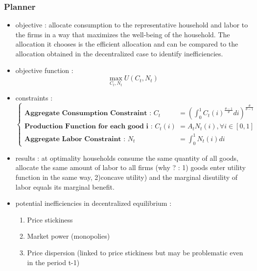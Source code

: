 \documentclass{article}
\begin{document}

\subsubsection{Planner}
\begin{itemize}
    \item objective : allocate consumption to the representative household and labor to the firms in a way that maximizes the well-being of the household. The allocation it chooses is the efficient allocation and can be compared to the allocation obtained in the decentralized case to identify inefficiencies. 
    \item objective function : 
    \begin{equation}
        \max_{C_t,N_t} U(C_t,N_t)
    \end{equation}
    \item constraints : 
    \begin{equation}
    \left\{
    \begin{aligned}
        \textbf{Aggregate Consumption Constraint : }C_t &= \left(\int_0^1C_t(i)^{\frac{\theta-1}{\theta}}di \right)^{\frac{\theta}{\theta-1}}\\
        \textbf{Production Function for each good i : }C_t(i) &= A_tN_t(i), \forall i\in[0,1]\\
        \textbf{Aggregate Labor Constraint : } N_t&=\int_0^1N_t(i)di
    \end{aligned}  
    \right.
    \end{equation}
    \item results : at optimality households consume the same quantity of all goods, allocate the same amount of labor to all firms (why ? : 1) goods enter utility function in the same way, 2)concave utility) and the marginal disutility of labor equals its marginal benefit. 
    \item potential inefficiencies in decentralized equilibrium : 
    \begin{enumerate}
        \item Price stickiness 
        \item Market power (monopolies)
        \item Price dispersion (linked to price stickiness but may be problematic even in the period t-1)
    \end{enumerate}
\end{itemize}
\end{document}

